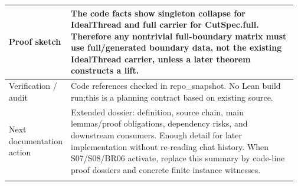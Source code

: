 \begin{longtable}{L{0.16\linewidth} L{0.81\linewidth}}
\hline\addlinespace[0.20em]
Proof sketch & The code facts show singleton collapse for IdealThread and full carrier for CutSpec.full. Therefore any nontrivial full-boundary matrix must use full/\allowbreak{}generated boundary data, not the existing IdealThread carrier, unless a later theorem constructs a lift.\\
\hline\addlinespace[0.20em]
Verification /\allowbreak{} audit & Code references checked in repo\_snapshot. No Lean build run;\newline this is a planning contract based on existing source.\\
\hline\addlinespace[0.20em]
Next documentation action & Extended dossier: definition, source chain, main lemmas/\allowbreak{}proof obligations, dependency risks, and downstream consumers. Enough detail for later implementation without re-reading chat history. When S07/\allowbreak{}S08/\allowbreak{}BR06 activate, replace this summary by code-line proof dossiers and concrete finite instance witnesses.\\
\hline\addlinespace[0.20em]
\end{longtable}
